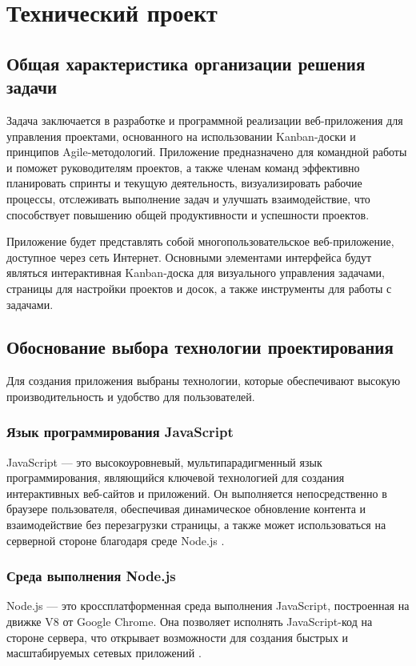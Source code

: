 \section{Технический проект}
\subsection{Общая характеристика организации решения задачи}

Задача заключается в разработке и программной реализации веб-приложения для управления проектами, основанного на использовании Kanban-доски и принципов Agile-методологий. Приложение предназначено для командной работы и поможет руководителям проектов, а также членам команд эффективно планировать спринты и текущую деятельность, визуализировать рабочие процессы, отслеживать выполнение задач и улучшать взаимодействие, что способствует повышению общей продуктивности и успешности проектов.

Приложение будет представлять собой многопользовательское веб-приложение, доступное через сеть Интернет. Основными элементами интерфейса будут являться интерактивная Kanban-доска для визуального управления задачами, страницы для настройки проектов и досок, а также инструменты для работы с задачами.

\subsection{Обоснование выбора технологии проектирования}

Для создания приложения выбраны технологии, которые обеспечивают высокую производительность и удобство для пользователей. 

\subsubsection{Язык программирования JavaScript}
JavaScript — это высокоуровневый, мультипарадигменный язык программирования, являющийся ключевой технологией для создания интерактивных веб-сайтов и приложений. Он выполняется непосредственно в браузере пользователя, обеспечивая динамическое обновление контента и взаимодействие без перезагрузки страницы, а также может использоваться на серверной стороне благодаря среде Node.js \cite{javascript1}.

\subsubsection{Среда выполнения Node.js}
Node.js — это кроссплатформенная среда выполнения JavaScript, построенная на движке V8 от Google Chrome. Она позволяет исполнять JavaScript-код на стороне сервера, что открывает возможности для создания быстрых и масштабируемых сетевых приложений \cite{nodejs1}.

